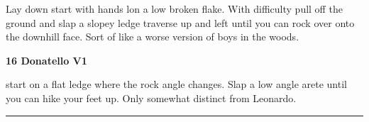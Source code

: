 \begin{multicols}{2}
\begin{minipage}{\linewidth}
					\begin{adjustwidth}{0.5cm}{}				
					Lay down start with hands lon a low broken flake. With difficulty pull off the ground and slap a slopey ledge traverse up and left until you can rock over onto the downhill face. Sort of like a worse version of boys in the woods.
					\end{adjustwidth}
					\end{minipage}
					\begin{minipage}{\linewidth}	
					\label{rt:Donatello}
\colorbox{green!20}{
\textbf{
16 Donatello V1   
}
}

					\begin{adjustwidth}{0.5cm}{}				
					start on a flat ledge where the rock angle changes. Slap a low angle arete until you can hike your feet up. Only somewhat distinct from Leonardo.
					\end{adjustwidth}
					\end{minipage}
\end{multicols}
\rule{\textwidth}{1pt}
